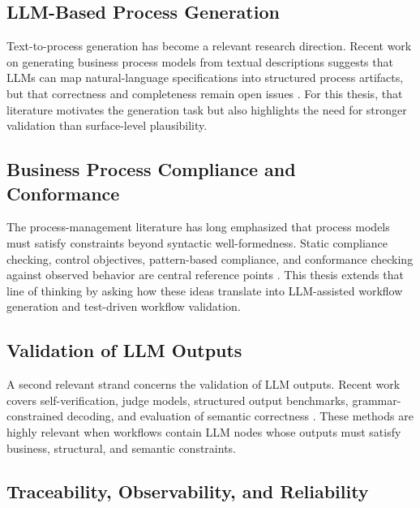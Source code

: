 \documentclass[12pt,a4paper]{article}
\begin{document}
\subsection{LLM-Based Process Generation}

Text-to-process generation has become a relevant research direction. Recent work on generating business process models from textual descriptions suggests that LLMs can map natural-language specifications into structured process artifacts, but that correctness and completeness remain open issues \cite{li-etal-2025-llm-based-business,DBLP:conf/ijcnn/LiNLLZ23,li-etal-2023-mad-data}. For this thesis, that literature motivates the generation task but also highlights the need for stronger validation than surface-level plausibility.

\subsection{Business Process Compliance and Conformance}

The process-management literature has long emphasized that process models must satisfy constraints beyond syntactic well-formedness. Static compliance checking, control objectives, pattern-based compliance, and conformance checking against observed behavior are central reference points \cite{LMX07,SGN07,NS07a,RA08,ABD05}. This thesis extends that line of thinking by asking how these ideas translate into LLM-assisted workflow generation and test-driven workflow validation.

\subsection{Validation of LLM Outputs}

A second relevant strand concerns the validation of LLM outputs. Recent work covers self-verification, judge models, structured output benchmarks, grammar-constrained decoding, and evaluation of semantic correctness \cite{lightman2023verify,dhuliawala2024cove,liu2023geval,tan2024judgebench,geng2025jsonschemabench,park2024grammaraligned,park2025flexible}. These methods are highly relevant when workflows contain LLM nodes whose outputs must satisfy business, structural, and semantic constraints.

\subsection{Traceability, Observability, and Reliability}
\end{document}
